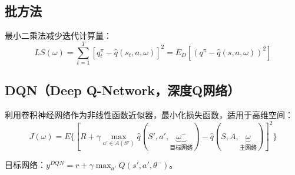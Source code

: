 \documentclass[
12pt, %
a4paper, 
oneside, %
headinclude,footinclude, %
]{scrartcl}
\begin{document}
\subsection[批方法]{批方法}
最小二乘法减少迭代计算量：
$$ LS(\omega) = \sum_{t = 1}^{T}[q_t^{\pi} - \hat{q}(s_t, a, \omega)]^2 = E_D[(q^{\pi} - \hat{q}(s, a, \omega))^2] $$
\subsection[DQN]{DQN（Deep Q-Network，深度Q网络）}
利用卷积神经网络作为非线性函数近似器，最小化损失函数，适用于高维空间：
$$ J(\omega) = E\{[R + \gamma \max_{a' \in A(S')} \hat{q}(S', a', \underbrace{\omega^-}_{\text{目标网络}}) - \hat{q}(S, A, \underbrace{\omega}_{\text{主网络}})]^2\} $$

目标网络：$ y^{DQN} = r + \gamma \max_{a'} Q(s', a', \theta^-) $。
\end{document}
